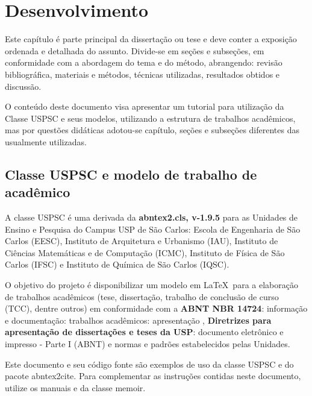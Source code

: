 

\chapter{Desenvolvimento}\label{cap_exemplos}
Este capítulo é parte principal da dissertação ou tese e deve conter a exposição ordenada e detalhada do assunto. Divide-se em seções e subseções, em conformidade com a abordagem do tema e do método, abrangendo: revisão bibliográfica, materiais e métodos, técnicas utilizadas, resultados obtidos e discussão.

O conteúdo deste documento visa apresentar um tutorial para utilização da Classe USPSC e seus modelos, utilizando a estrutura de trabalhos acadêmicos, mas por questões didáticas adotou-se capítulo, seções e subseções diferentes das usualmente utilizadas.


\section{Classe USPSC e modelo de trabalho de acadêmico}
A classe USPSC é uma derivada da \textbf{\textsf{abntex2}.cls, v-1.9.5} para as Unidades de Ensino e Pesquisa do Campus USP de São Carlos:
Escola de Engenharia de São Carlos (EESC), Instituto de Arquitetura e Urbanismo (IAU), Instituto de Ciências Matemáticas e de Computação (ICMC), Instituto de Física de São Carlos (IFSC) e Instituto de Química de São Carlos (IQSC).

O objetivo do projeto é disponibilizar um modelo em \LaTeX\  para a elaboração de trabalhos acadêmicos (tese, dissertação, trabalho de conclusão de curso (TCC), dentre outros) em conformidade com a \textbf{ABNT NBR 14724}: informação e documentação: trabalhos acadêmicos: apresentação \cite{nbr14724}, \textbf{Diretrizes para apresentação de dissertações e teses da USP}: documento eletrônico e impresso - Parte I (ABNT) \cite{sibi2009} e normas e padrões estabelecidos pelas Unidades.

Este documento e seu código fonte são exemplos de uso da classe USPSC e do pacote \textsf{abntex2cite}.
Para complementar as instruções contidas neste documento, utilize os manuais \cite{abnetxclasse,abnetxcite,abnetxcitealf} e da classe \textsf{memoir}\cite{memoir2010}. 

